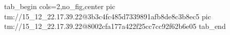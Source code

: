  
 
 
 
 

\qqSecOrig


\ifcmt
  tab_begin cols=2,no_fig,center
    pic tm://15_12_22.17.39.22@3b3c4fc485d7339891afb8de8c3b8ec5
    pic tm://15_12_22.17.39.22@8002cfa177a422f25cc7cc92f62b6e05
  tab_end
\fi

